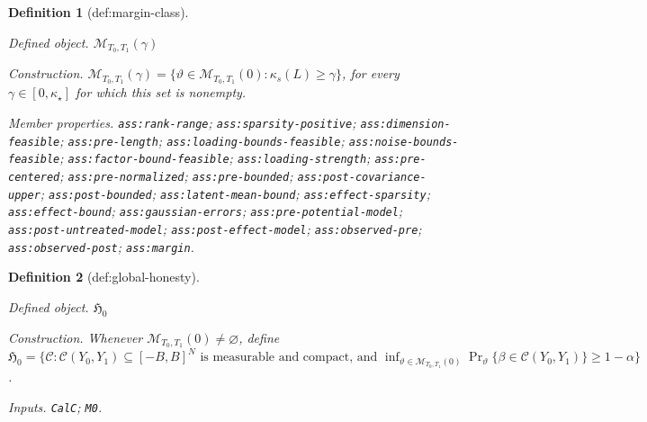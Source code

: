 \documentclass{article}
\newtheorem{definition}{Definition}
\begin{document}
\begin{definition}[def:margin-class]\label{def:margin-class}
\par\smallskip\noindent\emph{Defined object.} \(\mathcal M_{T_0,T_1}(\gamma)\)
\par\smallskip\noindent\emph{Construction.} \(\mathcal M_{T_0,T_1}(\gamma)=\{\vartheta\in\mathcal M_{T_0,T_1}(0):\kappa_s(L)\ge\gamma\}\), for every \(\gamma\in[0,\kappa_\star]\) for which this set is nonempty.
\par\smallskip\noindent\emph{Member properties.} \texttt{ass:\allowbreak{}rank-\allowbreak{}range}; \texttt{ass:\allowbreak{}sparsity-\allowbreak{}positive}; \texttt{ass:\allowbreak{}dimension-\allowbreak{}feasible}; \texttt{ass:\allowbreak{}pre-\allowbreak{}length}; \texttt{ass:\allowbreak{}loading-\allowbreak{}bounds-\allowbreak{}feasible}; \texttt{ass:\allowbreak{}noise-\allowbreak{}bounds-\allowbreak{}feasible}; \texttt{ass:\allowbreak{}factor-\allowbreak{}bound-\allowbreak{}feasible}; \texttt{ass:\allowbreak{}loading-\allowbreak{}strength}; \texttt{ass:\allowbreak{}pre-\allowbreak{}centered}; \texttt{ass:\allowbreak{}pre-\allowbreak{}normalized}; \texttt{ass:\allowbreak{}pre-\allowbreak{}bounded}; \texttt{ass:\allowbreak{}post-\allowbreak{}covariance-\allowbreak{}upper}; \texttt{ass:\allowbreak{}post-\allowbreak{}bounded}; \texttt{ass:\allowbreak{}latent-\allowbreak{}mean-\allowbreak{}bound}; \texttt{ass:\allowbreak{}effect-\allowbreak{}sparsity}; \texttt{ass:\allowbreak{}effect-\allowbreak{}bound}; \texttt{ass:\allowbreak{}gaussian-\allowbreak{}errors}; \texttt{ass:\allowbreak{}pre-\allowbreak{}potential-\allowbreak{}model}; \texttt{ass:\allowbreak{}post-\allowbreak{}untreated-\allowbreak{}model}; \texttt{ass:\allowbreak{}post-\allowbreak{}effect-\allowbreak{}model}; \texttt{ass:\allowbreak{}observed-\allowbreak{}pre}; \texttt{ass:\allowbreak{}observed-\allowbreak{}post}; \texttt{ass:\allowbreak{}margin}.
\end{definition}

\begin{definition}[def:global-honesty]\label{def:global-honesty}
\par\smallskip\noindent\emph{Defined object.} \(\mathfrak H_0\)
\par\smallskip\noindent\emph{Construction.} Whenever \(\mathcal M_{T_0,T_1}(0)\ne\varnothing\), define \(\mathfrak H_0=\{\mathcal C:\mathcal C(Y_0,Y_1)\subseteq[-B,B]^N\text{ is measurable and compact, and }\inf_{\vartheta\in\mathcal M_{T_0,T_1}(0)}\Pr_\vartheta\{\beta\in\mathcal C(Y_0,Y_1)\}\ge1-\alpha\}\).
\par\smallskip\noindent\emph{Inputs.} \texttt{CalC}; \texttt{M0}.
\end{definition}
\end{document}

